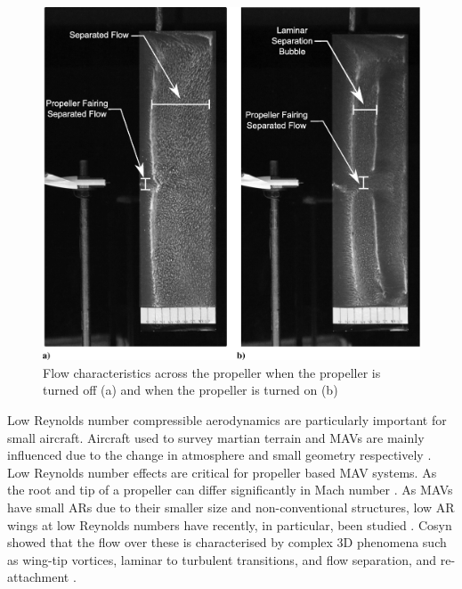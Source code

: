 \begin{figure}[H]
  \centering
  \includegraphics[width=0.8\linewidth]{03_LiteratureReview/Figs/blades.jpeg}
  \caption{Flow characteristics across the propeller when the propeller is turned off (a) and when the propeller is turned on (b) \cite{Ananda2018}}
  \label{fig:bladeslow}
\end{figure}




Low Reynolds number compressible aerodynamics are particularly important for small aircraft. Aircraft used to survey martian terrain and \acrshort{MAV}s are mainly influenced due to the change in atmosphere and small geometry respectively \cite{Munday2015}. Low Reynolds number effects are critical for propeller based MAV systems. As the root and tip of a propeller can differ significantly in Mach number \cite{Munday2015}. As \acrshort{MAV}s have small \acrshort{AR}s due to their smaller size and non-conventional structures, low \acrshort{AR} wings at low Reynolds numbers have recently, in particular, been studied \cite{Bhat2019} \cite{Torres2012}. Cosyn showed that the flow over these is characterised by complex 3D phenomena such as wing-tip vortices, laminar to turbulent transitions, and flow separation, and re-attachment \cite{Cosyn2012}.

